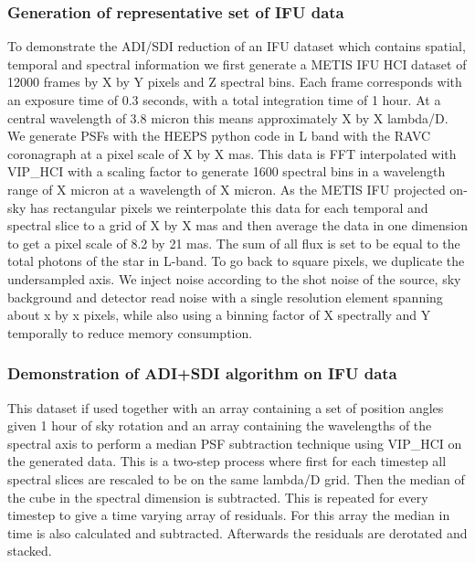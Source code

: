 \subsubsection{Generation of representative set of IFU data}

To demonstrate the ADI/SDI reduction of an IFU dataset which contains spatial, temporal and spectral information we first generate a METIS IFU HCI dataset of 12000 frames by X by Y pixels and Z spectral bins. Each frame corresponds with an exposure time of 0.3 seconds, with a total integration time of 1 hour. At a central wavelength of 3.8 micron this means approximately X by X lambda/D. 
We generate PSFs with the HEEPS python code in L band with the RAVC coronagraph at a pixel scale of X by X mas. This data is FFT interpolated with VIP\_HCI with a scaling factor to generate 1600 spectral bins in a wavelength range of X micron at a wavelength of X micron.
As the METIS IFU projected on-sky has rectangular pixels we reinterpolate this data for each temporal and spectral slice to a grid of X by X mas and then average the data in one dimension to get a pixel scale of 8.2 by 21 mas. The sum of all flux is set to be equal to the total photons of the star in L-band.
To go back to square pixels, we duplicate the undersampled axis. We inject noise according to the shot noise of the source, sky background and detector read noise with a single resolution element spanning about x by x pixels, while also using a binning factor of X spectrally and Y temporally to reduce memory consumption.



 


\subsubsection{Demonstration of ADI+SDI algorithm on IFU data}


This dataset if used together with an array containing a set of position angles given 1 hour of sky rotation and an array containing the wavelengths of the spectral axis to perform a median PSF subtraction technique using VIP\_HCI on the generated data. This is a two-step process where first for each timestep all spectral slices are rescaled to be on the same lambda/D grid. Then the median of the cube in the spectral dimension is subtracted. This is repeated for every timestep to give a time varying array of residuals. For this array the median in time is also calculated and subtracted. Afterwards the residuals are derotated and stacked. 